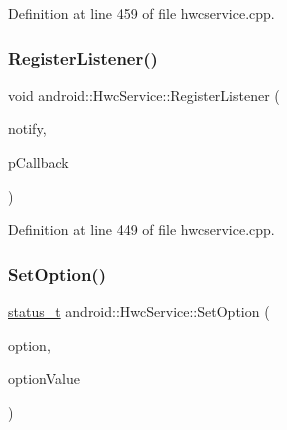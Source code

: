 Definition at line 459 of file hwcservice.\+cpp.


\begin{DoxyCode}{0}
\end{DoxyCode}
\mbox{\label{classandroid_1_1HwcService_a70e88e6da20467baf70f33cfe341583c}} 
\subsubsection{\texorpdfstring{Register\+Listener()}{RegisterListener()}}
{\footnotesize\ttfamily void android\+::\+Hwc\+Service\+::\+Register\+Listener (\begin{DoxyParamCaption}\item[{\mbox{\hyperlink{classandroid_1_1HwcService_a34049a831dd1c85ef002e59be99d1bd8}{E\+Notification}}}]{notify,  }\item[{\mbox{\hyperlink{classandroid_1_1HwcService_1_1NotifyCallback}{Notify\+Callback}} $\ast$}]{p\+Callback }\end{DoxyParamCaption})}



Definition at line 449 of file hwcservice.\+cpp.


\begin{DoxyCode}{0}
\end{DoxyCode}
\mbox{\label{classandroid_1_1HwcService_afbbee67c5f3220d22d7a319f09dc0314}} 
\subsubsection{\texorpdfstring{Set\+Option()}{SetOption()}}
{\footnotesize\ttfamily \mbox{\hyperlink{hwcserviceapi_8h_a3806fb2027d9a316d8ca8d9b8b8eb96f}{status\+\_\+t}} android\+::\+Hwc\+Service\+::\+Set\+Option (\begin{DoxyParamCaption}\item[{android\+::\+String8}]{option,  }\item[{android\+::\+String8}]{option\+Value }\end{DoxyParamCaption})}



